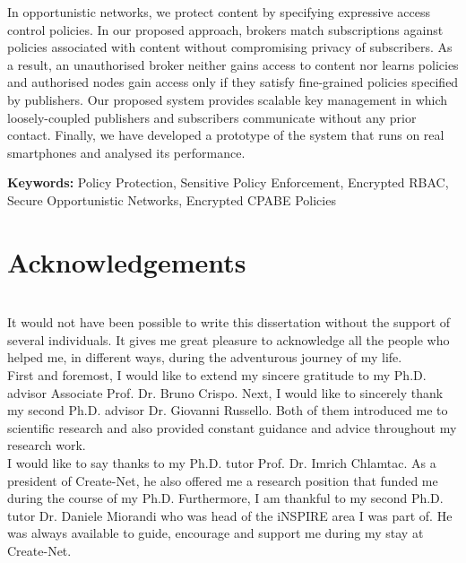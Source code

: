 \documentclass[epsfig,a4paper,11pt,titlepage]{book}
\numberwithin{algorithm}{chapter}
\begin{document}
In opportunistic networks, we protect content by specifying expressive access control policies. In our proposed approach, brokers match subscriptions against policies associated with content without compromising privacy of subscribers. As a result, an unauthorised broker neither gains access to content nor learns policies and authorised nodes gain access only if they satisfy fine-grained policies specified by publishers. Our proposed system provides scalable key management in which loosely-coupled publishers and subscribers communicate without any prior contact. Finally, we have developed a prototype of the system that runs on real smartphones and analysed its performance.

\vspace{8mm}
\noindent
{\bf Keywords:}
Policy Protection, Sensitive Policy Enforcement, Encrypted \acrshort{RBAC}, Secure Opportunistic Networks, Encrypted \acrshort{CPABE} Policies



\chapter*{Acknowledgements}

\noindent \\

It would not have been possible to write this dissertation without the support of several individuals. It gives me great pleasure to acknowledge all the people who helped me, in different ways, during the adventurous journey of my life. \\

First and foremost, I would like to extend my sincere gratitude to my Ph.D. advisor Associate Prof. Dr. Bruno Crispo. Next, I would like to sincerely thank my second Ph.D. advisor Dr. Giovanni Russello. Both of them introduced me to scientific research and also provided constant guidance and advice throughout my research work. \\

I would like to say thanks to my Ph.D. tutor Prof. Dr. Imrich Chlamtac. As a president of Create-Net, he also offered me a research position that funded me during the course of my Ph.D. Furthermore, I am thankful to my second Ph.D. tutor Dr. Daniele Miorandi who was head of the iNSPIRE area I was part of. He was always available to guide, encourage and support me during my stay at Create-Net. \\
\end{document}
